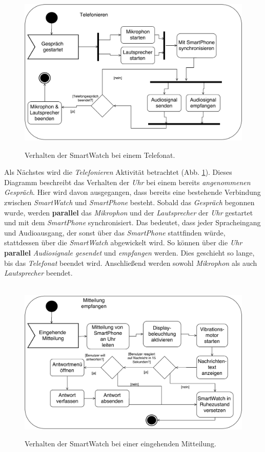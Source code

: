 \begin{figure}[h]
\centering\
\includegraphics[width=\textwidth]{img/activityTelefonieren}
\caption{Verhalten der SmartWatch bei einem Telefonat.}\label{fig:activityTelefonieren}
\end{figure}
Als Nächstes wird die \textit{Telefonieren} Aktivität betrachtet (Abb. \ref{fig:activityTelefonieren}). Dieses Diagramm beschreibt das Verhalten der \textit{Uhr} bei einem bereits \textit{angenommenen Gespräch}. Hier wird davon ausgegangen, dass bereits eine bestehende Verbindung zwischen \textit{SmartWatch} und \textit{SmartPhone} besteht. Sobald das \textit{Gespräch} begonnen wurde, werden \textbf{parallel} das \textit{Mikrophon} und der \textit{Lautsprecher} der \textit{Uhr} gestartet und mit dem \textit{SmartPhone} synchronisiert. Das bedeutet, dass jeder Spracheingang und Audioausgang, der sonst über das \textit{SmartPhone} stattfinden würde, stattdessen über die \textit{SmartWatch} abgewickelt wird. So können über die \textit{Uhr} \textbf{parallel} \textit{Audiosignale gesendet} und \textit{empfangen} werden. Dies geschieht so lange, bis das \textit{Telefonat} beendet wird. Anschließend werden sowohl \textit{Mikrophon} als auch \textit{Lautsprecher} beendet.\\
\begin{figure}[h]
\centering\
\includegraphics[width=\textwidth]{img/activityMitteilung}
\caption{Verhalten der SmartWatch bei einer eingehenden Mitteilung.}\label{fig:activityMitteilung}
\end{figure}
